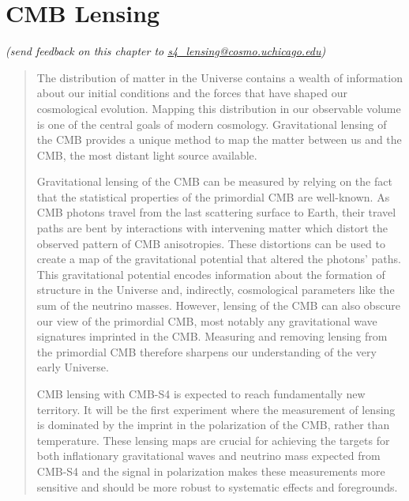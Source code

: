  
\chapter{CMB Lensing}

\begin{center}
{\small \it (send feedback on this chapter to \href{mailto:s4_lensing@cosmo.uchicago.edu}{s4\_lensing@cosmo.uchicago.edu})}
\end{center}



\def\nnu{N_{\mathrm eff}}
\def\gtrsim{\raise-.75ex\hbox{$\buildrel>\over\sim$}}

\begin{quotation}

The distribution of matter in the Universe contains a wealth of information about our initial conditions and the forces that have shaped our cosmological evolution.  Mapping this distribution in our observable volume is one of the central goals of modern cosmology.  Gravitational lensing of the CMB provides a unique method to map the matter between us and the CMB, the most distant light source available.  

Gravitational lensing of the CMB can be measured by relying on the fact that the statistical properties of the primordial CMB are well-known.  As CMB photons travel from the last scattering surface to Earth, their travel paths are bent by interactions with intervening matter which distort the observed pattern of CMB anisotropies.  These distortions can be used to create a map of the gravitational potential that altered the photons' paths.  This gravitational potential encodes information about the formation of structure in the Universe and, indirectly, cosmological parameters like the sum of the neutrino masses.  However, lensing of the CMB can also obscure our view of the primordial CMB, most notably any gravitational wave signatures imprinted in the CMB.  Measuring and removing lensing from the primordial CMB therefore sharpens our understanding of the very early Universe.  

CMB lensing with CMB-S4 is expected to reach fundamentally new territory.  It will be the first experiment where the measurement of lensing is dominated by the imprint in the polarization of the CMB, rather than temperature.  These lensing maps are crucial for achieving the targets for both inflationary gravitational waves and neutrino mass expected from CMB-S4 and the signal in polarization makes these measurements more sensitive and should be more robust to systematic effects and foregrounds.    


\end{quotation}

